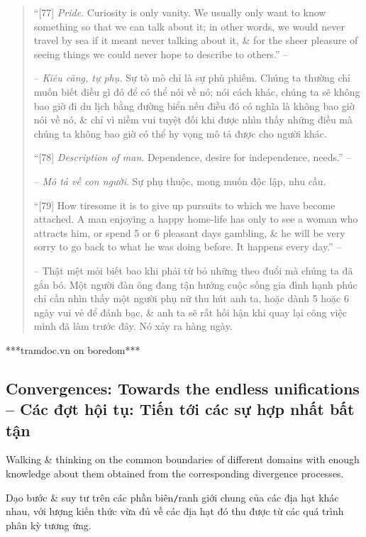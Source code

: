 \documentclass[12pt]{article}
\begin{document}
\begin{quote}
	``[77] {\it Pride}. Curiosity is only vanity. We usually only want to know something so that we can talk about it; in other words, we would never travel by sea if it meant never talking about it, \& for the sheer pleasure of seeing things we could never hope to describe to others.'' -- \cite[IV. Boredom]{Pascal_pensees}
	
	-- {\it Kiêu căng, tự phụ.} Sự tò mò chỉ là sự phù phiếm. Chúng ta thường chỉ muốn biết điều gì đó để có thể nói về nó; nói cách khác, chúng ta sẽ không bao giờ đi du lịch bằng đường biển nếu điều đó có nghĩa là không bao giờ nói về nó, \& chỉ vì niềm vui tuyệt đối khi được nhìn thấy những điều mà chúng ta không bao giờ có thể hy vọng mô tả được cho người khác.
	
	``[78] {\it Description of man}. Dependence, desire for independence, needs.'' -- \cite[IV. Boredom]{Pascal_pensees}
	
	-- {\it Mô tả về con người}. Sự phụ thuộc, mong muốn độc lập, nhu cầu.
		
	``[79] How tiresome it is to give up pursuits to which we have become attached. A man enjoying a happy home-life has only to see a woman who attracts him, or spend 5 or 6 pleasant days gambling, \& he will be very sorry to go back to what he was doing before. It happens every day.'' -- \cite[IV. Boredom]{Pascal_pensees}
	
	-- Thật mệt mỏi biết bao khi phải từ bỏ những theo đuổi mà chúng ta đã gắn bó. Một người đàn ông đang tận hưởng cuộc sống gia đình hạnh phúc chỉ cần nhìn thấy một người phụ nữ thu hút anh ta, hoặc dành 5 hoặc 6 ngày vui vẻ để đánh bạc, \& anh ta sẽ rất hối hận khi quay lại công việc mình đã làm trước đây. Nó xảy ra hàng ngày.
\end{quote}

***tramdoc.vn on boredom***


\subsection{Convergences: Towards the endless unifications -- Các đợt hội tụ: Tiến tới các sự hợp nhất bất tận}
Walking \& thinking on the common boundaries of different domains with enough knowledge about them obtained from the corresponding divergence processes.

Dạo bước \& suy tư trên các phần biên{\tt/}ranh giới chung của các địa hạt khác nhau, với lượng kiến thức vừa đủ về các địa hạt đó thu được từ các quá trình phân kỳ tương ứng.
\end{document}
